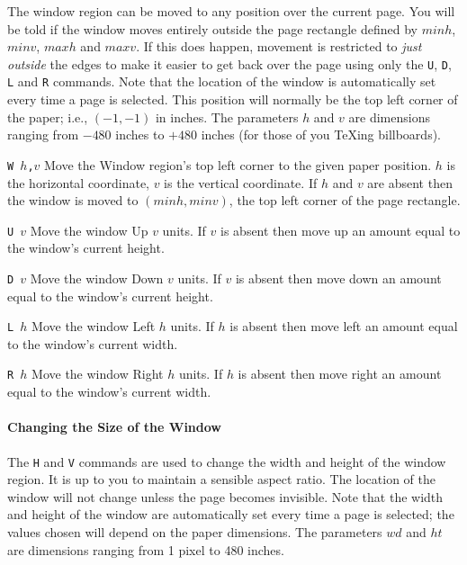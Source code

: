 The window region can be moved to any position over the current page.
You will be told if the window moves entirely outside the page rectangle
defined by $minh$, $minv$, $maxh$ and $maxv$.  If this does happen, movement
is restricted to {\em just outside\/} the edges to make it easier to get back
over the page using only the \verb+U+, \verb+D+, \verb+L+ and \verb+R+ commands.
Note that the location of the window is automatically set every time a
page is selected.  This position will normally be
the top left corner of the paper; i.e., $(-1,-1)$ in inches.
The parameters $h$ and $v$ are dimensions ranging from $-480$ inches to
$+480$ inches (for those of you \TeX ing billboards).
\begin{list}%
{}%
{\settowidth{\labelwidth}{\tt W $h$,$v$}
\settowidth{\labelsep}{aaaa}
\settowidth{\rightmargin}{aaa}
\addtolength{\labelwidth}{\labelsep}
\setlength{\leftmargin}{\labelwidth}}

\item[\tt W $h$,$v$]
Move the Window region's top left corner to the given paper position.
$h$ is the horizontal coordinate, $v$ is the vertical coordinate.
If $h$ and $v$ are absent then the window is moved to $(minh{,}minv)$,
the top left corner of the page rectangle.

\item[\tt U $v$]
Move the window Up $v$ units.
If $v$ is absent then move up an amount equal to the window's current height.

\item[\tt D $v$]
Move the window Down $v$ units.
If $v$ is absent then move down an amount equal to the window's current height.

\item[\tt L $h$]
Move the window Left $h$ units.
If $h$ is absent then move left an amount equal to the window's current width.

\item[\tt R $h$]
Move the window Right $h$ units.
If $h$ is absent then move right an amount equal to the window's current width.
\end{list}

\paragraph{Changing the Size of the Window}


The \verb+H+ and \verb+V+ commands are used to change the
width and height of the window region.
It is up to you to maintain a sensible aspect ratio.
The location of the window will not change unless the page becomes invisible.
Note that the width and height of the window are automatically set every time a
page is selected; the values chosen will depend on the paper dimensions.
The parameters $wd$ and $ht$ are dimensions ranging from 1 pixel to 480 inches.

